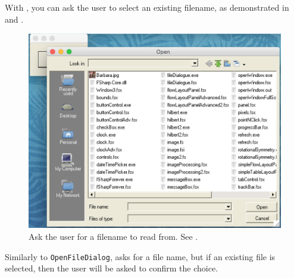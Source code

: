 \documentclass[fsharpNotes.tex]{subfiles}
\begin{document}
With , you can ask the user to select an existing filename, as demonstrated in  and .
%
%
\begin{figure}
  \centering
  \includegraphics[scale=0.5]{openFileDialog}
  \caption{Ask the user for a filename to read from. See .}
  \label{fig:openFileDialog}
\end{figure}
%
Similarly to \lstinline{OpenFileDialog},  asks for a file name, but if an existing file is selected, then the user will be asked to confirm the choice.
\clearpage
\end{document}
